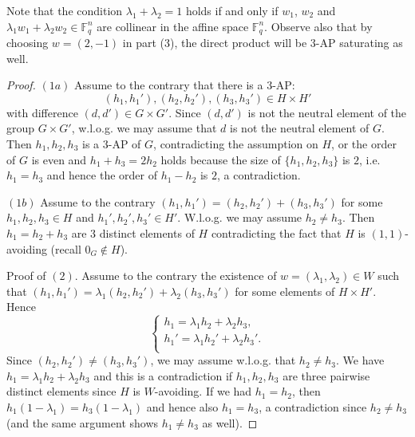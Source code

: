 \documentclass[11pt]{article}
\numberwithin{table}{section}
\newcommand{\F}{{\mathbb F}}
\theoremstyle{definition}
\begin{document}
	Note that the condition $\lambda_1+\lambda_2=1$ holds if and only if  $w_1$, $w_2 $ and   $\lambda_1w_1 + \lambda_2w_2 \in \F_q^n$ are collinear in the affine space $\F_q^n$.
	Observe also that by choosing $w=(2, -1)$ in part (3), 
	the direct product will be $3$-$\mathrm{AP}$ saturating as well.
	
	\begin{proof}
		$(1a)$ Assume to the contrary that there is a $3$-$\mathrm{AP}$: 
		\[(h_1,h_1'),(h_2,h_2'),(h_3,h_3') \in  H\times H'\] 
		with difference $(d,d')\in G\times G'$. Since $(d,d')$ is not the neutral element of the group $G\times G'$, w.l.o.g. we may assume that $d$ is not the neutral element of $G$.
		Then $h_1,h_2,h_3$ is a $3$-$\mathrm{AP}$ of $G$, contradicting the assumption on $H$, or the order of $G$ is even and $h_1+h_3=2h_2$ holds because the size of $\{h_1,h_2,h_3\}$ is $2$, i.e. $h_1=h_3$ and hence the order of $h_1-h_2$ is $2$, a contradiction.
		
		$(1b)$ Assume to the contrary 
		$(h_1,h_1')=(h_2,h_2')+(h_3,h_3')$ for some $h_1,h_2,h_3 \in H$ and $h_1',h_2',h_3' \in H'$. W.l.o.g. we may assume $h_2 \neq h_3$. Then $h_1=h_2+h_3$ are $3$ distinct elements of $H$ contradicting the fact that $H$ is $(1,1)$-avoiding (recall $0_G\notin H$). 
		
		Proof of $(2)$. Assume to the contrary the existence of $w=(\lambda_1, \lambda_2 )\in W$ such that  $(h_1,h_1')= \lambda_1(h_2,h_2')+ \lambda_2(h_3,h_3')$ for some elements of $H\times H'$.  Hence
		\begin{equation*}   
			\begin{cases}
				h_1=\lambda_1h_2+\lambda_2h_3,\\
				h_1'=\lambda_1h_2'+\lambda_2h_3'.\\
			\end{cases}
		\end{equation*}
		Since $(h_2,h_2')\neq (h_3,h_3')$, we may assume w.l.o.g. that $h_2 \neq h_3$.
		We have $h_1=\lambda_1 h_2 + \lambda_2 h_3$ and this is a contradiction if $h_1, h_2, h_3$ are three pairwise distinct elements since $H$ is $W$-avoiding. If we had $h_1=h_2$, then $h_1(1-\lambda_1)=h_3(1-\lambda_1)$ and hence also $h_1=h_3$, a contradiction since $h_2 \neq h_3$ (and the same argument shows $h_1\neq h_3$ as well). %
		

\end{proof}
\end{document}
